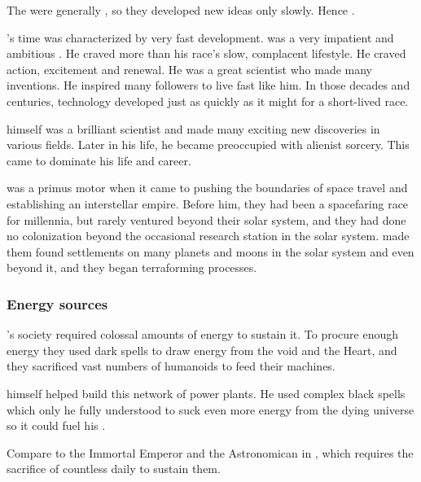 The \ophidians were generally , so they developed new ideas only slowly. 
Hence .

\Sethicus's time was characterized by very fast development. 
\Sethicus was a very impatient and ambitious \ophidian.
He craved more than his race's slow, complacent lifestyle.
He craved action, excitement and renewal.
He was a great scientist who made many inventions.
He inspired many followers to live fast like him. 
In those decades and centuries, technology developed just as quickly as it might for a short-lived race.

\Sethicus himself was a brilliant scientist and made many exciting new discoveries in various fields. 
Later in his life, he became preoccupied with alienist sorcery.
This came to dominate his life and career. 

\Sethicus was a primus motor when it came to pushing the boundaries of space travel and establishing an interstellar \ophidian empire. 
Before him, they had been a spacefaring race for millennia, but rarely ventured beyond their solar system, and they had done no colonization beyond the occasional research station in the solar system. 
\Sethicus made them found settlements on many planets and moons in the solar system and even beyond it, and they began terraforming processes. 





\subsubsection{Energy sources}
\Sethicus's society required colossal amounts of energy to sustain it.
To procure enough energy they used dark spells to draw energy from the void and the Heart, and they sacrificed vast numbers of humanoids to feed their machines. 

\Sethicus himself helped build this network of power plants.
He used complex black spells which only he fully understood to suck even more energy from the dying universe so it could fuel his . 

Compare to the Immortal Emperor and the Astronomican in \cite{RPG:Warhammer40000}, which requires the sacrifice of countless \humans daily to sustain them.









